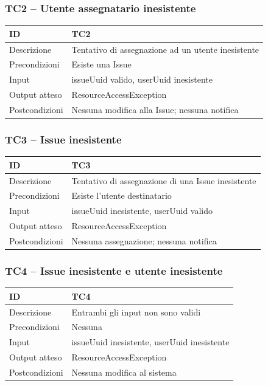 \documentclass[a4paper,12pt]{article}
\begin{document}
\subsubsection{TC2 -- Utente assegnatario inesistente}
\label{sec:TC2}

\begin{tabularx}{\textwidth}{p{5cm}|X}
ID & TC2 \\ \hline
Descrizione & Tentativo di assegnazione ad un utente inesistente \\ \hline
Precondizioni & Esiste una Issue \\ \hline
Input & issueUuid valido, userUuid inesistente \\ \hline
Output atteso & ResourceAccessException \\ \hline
Postcondizioni & Nessuna modifica alla Issue; nessuna notifica \\ \hline
\end{tabularx}

\subsubsection{TC3 -- Issue inesistente}
\label{sec:TC3}

\begin{tabularx}{\textwidth}{p{5cm}|X}
ID & TC3 \\ \hline
Descrizione & Tentativo di assegnazione di una Issue inesistente \\ \hline
Precondizioni & Esiste l'utente destinatario \\ \hline
Input & issueUuid inesistente, userUuid valido \\ \hline
Output atteso & ResourceAccessException \\ \hline
Postcondizioni & Nessuna assegnazione; nessuna notifica \\ \hline
\end{tabularx}

\subsubsection{TC4 -- Issue inesistente e utente inesistente}
\label{sec:TC4}

\begin{tabularx}{\textwidth}{p{5cm}|X}
ID & TC4 \\ \hline
Descrizione & Entrambi gli input non sono validi \\ \hline
Precondizioni & Nessuna \\ \hline
Input & issueUuid inesistente, userUuid inesistente \\ \hline
Output atteso & ResourceAccessException \\ \hline
Postcondizioni & Nessuna modifica al sistema \\ \hline
\end{tabularx}
\end{document}
